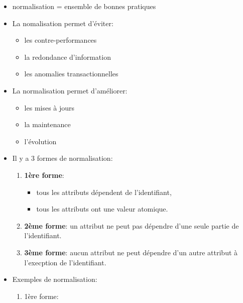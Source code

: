 \documentclass[a4paper]{article}
\begin{document}
\begin{itemize}



\item normalisation = ensemble de bonnes pratiques



\item La nomalisation permet d'éviter:
\begin{itemize}
    \item les contre-performances
    \item la redondance d'information
    \item les anomalies transactionnelles
\end{itemize}



\item La normalisation permet d'améliorer:
\begin{itemize}
    \item les mises à jours
    \item la maintenance
    \item l'évolution
\end{itemize}



\item Il y a 3 formes de normalisation:
\begin{enumerate}
    \item \textbf{1ère forme}:
    \begin{itemize}
        \item tous les attributs dépendent de l'identifiant,
        \item tous les attributs ont une valeur atomique.
    \end{itemize}
    \item \textbf{2ème forme}: un attribut ne peut pas dépendre d'une seule partie de l'identifiant.
    \item \textbf{3ème forme}: aucun attribut ne peut dépendre d'un autre attribut à l'execption de l'identifiant.
\end{enumerate}



\item Exemples de normalisation:
\begin{enumerate}

    \item 1ère forme:
    \begin{example}
        \begin{center}
\end{center}
\end{example}
\end{enumerate}
\end{itemize}
\end{document}
